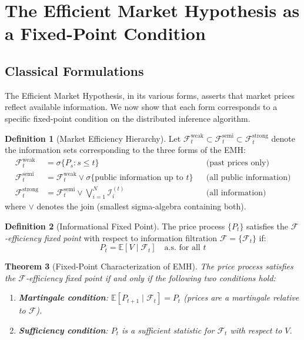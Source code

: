\documentclass[12pt,a4paper]{article}
\newtheorem{theorem}{Theorem}[section]
\theoremstyle{definition}
\newtheorem{definition}[theorem]{Definition}
\newcommand{\E}{\mathbb{E}}
\newcommand{\F}{\mathcal{F}}
\newcommand{\I}{\mathcal{I}}
\begin{document}
\section{The Efficient Market Hypothesis as a Fixed-Point Condition}\label{sec:emh_fixed_point}

\subsection{Classical Formulations}

The Efficient Market Hypothesis, in its various forms, asserts that market prices reflect available information. We now show that each form corresponds to a specific fixed-point condition on the distributed inference algorithm.

\begin{definition}[Market Efficiency Hierarchy]\label{def:emh_hierarchy}
Let $\F_t^{\text{weak}} \subset \F_t^{\text{semi}} \subset \F_t^{\text{strong}}$ denote the information sets corresponding to the three forms of the EMH:
\begin{align}
    \F_t^{\text{weak}} &= \sigma\{P_s : s \leq t\} & &\text{(past prices only)} \\
    \F_t^{\text{semi}} &= \F_t^{\text{weak}} \vee \sigma\{\text{public information up to } t\} & &\text{(all public information)} \\
    \F_t^{\text{strong}} &= \F_t^{\text{semi}} \vee \bigvee_{i=1}^N \I_i^{(t)} & &\text{(all information)}
\end{align}
where $\vee$ denotes the join (smallest sigma-algebra containing both).
\end{definition}

\begin{definition}[Informational Fixed Point]\label{def:fixed_point}
The price process $\{P_t\}$ satisfies the \emph{$\F$-efficiency fixed point} with respect to information filtration $\F = \{\F_t\}$ if:
\begin{equation}\label{eq:fixed_point}
    P_t = \E[V \mid \F_t] \quad \text{a.s. for all } t
\end{equation}
\end{definition}

\begin{theorem}[Fixed-Point Characterization of EMH]\label{thm:emh_fp}
The price process satisfies the $\F$-efficiency fixed point if and only if the following two conditions hold:
\begin{enumerate}[label=(\roman*)]
    \item \textbf{Martingale condition}: $\E[P_{t+1} \mid \F_t] = P_t$ (prices are a martingale relative to $\F$).
    \item \textbf{Sufficiency condition}: $P_t$ is a sufficient statistic for $\F_t$ with respect to $V$.
\end{enumerate}
\end{theorem}
\end{document}
